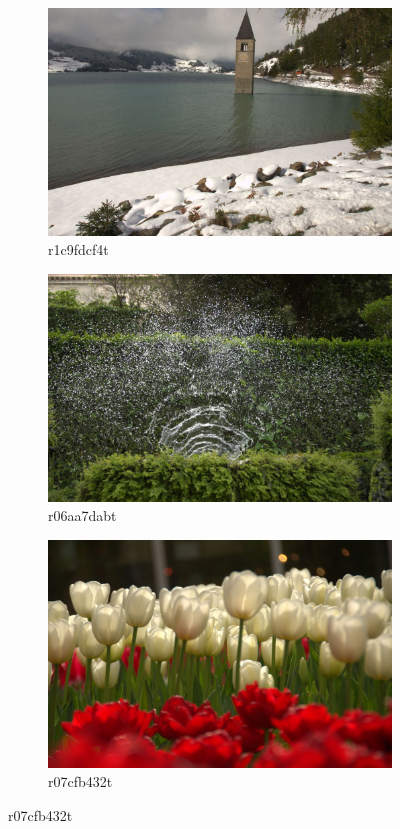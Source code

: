 \documentclass{ipol}
\begin{document}
\begin{figure}[ht]
    \begin{subfigure}[c]{.31\linewidth}\centering
    \includegraphics[width=\linewidth]{images/original/r1c9fdcf4t.jpeg}
    \caption{r1c9fdcf4t}
    \end{subfigure}\hfill%
    \begin{subfigure}[c]{.31\linewidth}\centering
    \includegraphics[width=\linewidth]{images/original/r06aa7dabt.jpeg}
    \caption{r06aa7dabt}
    \end{subfigure}\hfill%
    \begin{subfigure}[c]{.31\linewidth}\centering
    \includegraphics[width=\linewidth]{images/original/r07cfb432t.jpeg}
    \caption{r07cfb432t}
    \end{subfigure}
    

\end{figure}
\end{document}
